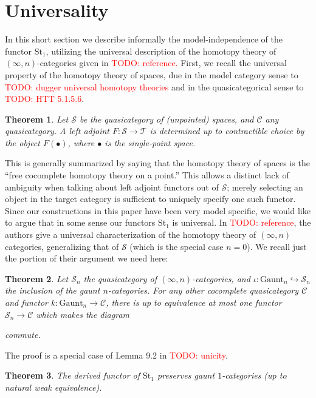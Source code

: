 \documentclass[12pt]{article}
\newtheorem{theorem}{Theorem}[section]
\theoremstyle{definition}
\newcommand{\TODO}[1]{\textcolor{red}{TODO: {#1}}}
\newcommand{\T}{\mathcal{T}}
\renewcommand{\S}{\mathcal{S}}
\newcommand{\C}{\mathcal{C}}
\newcommand{\st}{\text{St}}
\begin{document}
\section{Universality}
	In this short section we describe informally the model-independence of the functor $\st_1$, utilizing the universal description of the homotopy theory of $(\infty,n)$-categories given in \TODO{reference.}
	First, we recall the universal property of the homotopy theory of spaces, due in the model category sense to \TODO{dugger universal homotopy theories} and in the quasicategorical sense to \TODO{HTT 5.1.5.6}.
	\begin{theorem}
		Let $\S$ be the quasicategory of (unpointed) spaces, and $\C$ any quasicategory. A left adjoint $F: \S \to \T$ is determined up to contractible choice by the object $F(\bullet)$, where $\bullet$ is the single-point space.
	\end{theorem}
	This is generally summarized by saying that the homotopy theory of spaces is the ``free cocomplete homotopy theory on a point.'' 
	This allows a distinct lack of ambiguity when talking about left adjoint functors out of $\S$; 
	merely selecting an object in the target category is sufficient to uniquely specify one such functor. 
	Since our constructions in this paper have been very model specific, we would like to argue that in some sense our functors $\st_1$ is universal. 
	In \TODO{reference}, the authors give a universal characterization of the homotopy theory of $(\infty,n)$ categories, generalizing that of $\S$ (which is the special case $n=0$). We recall just the portion of their argument we need here:
	\begin{theorem}
		Let $\S_n$ the quasicategory of $(\infty,n)$-categories, and $\iota: \text{Gaunt}_n \hookrightarrow \S_n$ the inclusion of the gaunt $n$-categories. For any other cocomplete quasicategory $\C$ and functor $k: \text{Gaunt}_n \to \C$, there is up to equivalence at most one functor $\S_n \to \C$ which makes the diagram
		\begin{center}
		\end{center}
	commute.
	\end{theorem}
	The proof is a special case of Lemma 9.2 in \TODO{unicity}. 
	\begin{theorem}
		The derived functor of $\st_1$ preserves gaunt $1$-categories (up to natural weak equivalence). 
	\end{theorem}
\end{document}
